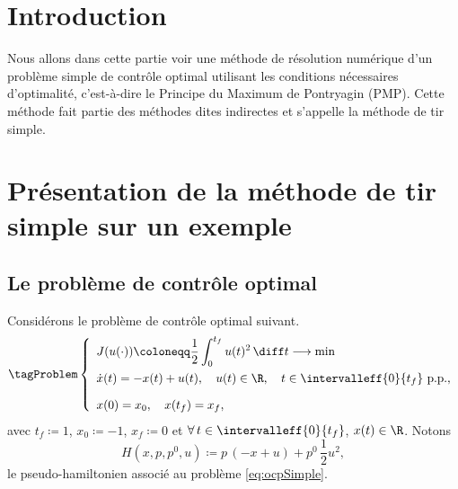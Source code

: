 \section{Introduction}

Nous allons dans cette partie voir une m\'ethode de r\'esolution num\'erique d'un probl\`eme simple de
contr\^ole optimal utilisant les conditions n\'ecessaires d'optimalit\'e, c'est-\`a-dire le Principe
du Maximum de Pontryagin (PMP). Cette m\'ethode fait partie des m\'ethodes dites indirectes et s'appelle
la m\'ethode de tir simple.

\section{Pr\'esentation de la m\'ethode de tir simple sur un exemple}

\subsection{Le probl\`eme de contr\^ole optimal}

    Consid\'erons le probl\`eme de contr\^ole optimal suivant.
    \leqnomode
    \begin{equation}
    \tagProblem
        \left\{ 
            \begin{array}{l}
                \displaystyle J(u(\cdot))  \coloneqq \displaystyle \frac{1}{2} \int_0^{t_f} u(t)^2 \, \diff t\longrightarrow \min \\[1.0em]
                \dot{x}(t)                      =  \displaystyle -x(t)+u(t), \quad  u(t) \in \R, \quad t \in \intervalleff{0}{t_f} \text{ p.p.}, \\[1.0em]
                x(0) = x_0 , \quad x(t_f) = x_f,
            \end{array}
        \right. 
        \label{eq:ocpSimple}
    \end{equation}
    \reqnomode
    avec $t_f \coloneqq 1$, $x_0 \coloneqq -1$, $x_f \coloneqq 0$ et $\forall\, t \in\intervalleff{0}{t_f}$, $x(t) \in \R$.
    Notons 
    \[
        H(x,p,p^0,u) \coloneqq p \, (-x+u) + p^0\, \frac{1}{2} u^2,
    \]
    le pseudo-hamiltonien associ\'e au probl\`eme \eqref{eq:ocpSimple}.

